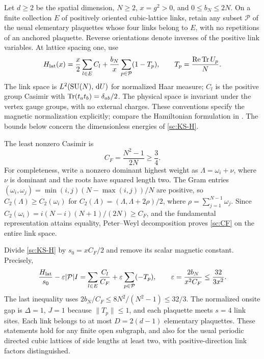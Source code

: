 Let $d\ge2$ be the spatial dimension, $N\ge2$, $x=g^2>0$, and
$0\le b_N\le2N$. On a finite collection $E$ of positively oriented
cubic-lattice links, retain any subset $\mathcal P$ of the usual
elementary plaquettes whose four links belong to $E$, with no repetitions
of an anchored plaquette. Reverse
orientations denote inverses of the positive link variables.
At lattice spacing one, use
\begin{equation}
 H_{\rm lat}(x)=\frac{x}{2}\sum_{l\in E}C_l+
       \frac{b_N}{x}\sum_{p\in\mathcal P}(1-T_p),
 \qquad T_p=\frac{\operatorname{Re}\operatorname{Tr} U_p}{N}.
 \label{sc:KS-H}
\end{equation}
The link space is $L^2(\operatorname{SU}(N),\,\mathrm d U)$ for normalized Haar measure;
$C_l$ is the positive group Casimir with
$\operatorname{Tr}(t_at_b)=\delta_{ab}/2$. The physical space is invariant under
the vertex gauge groups, with no external charges. These conventions
specify the magnetic normalization explicitly; compare the Hamiltonian
formulation in \cite{KS}. The bounds below concern the dimensionless
energies of \eqref{sc:KS-H}.

The least nonzero Casimir is
\begin{equation}
 C_F=\frac{N^2-1}{2N}\ge\frac34.
 \label{sc:CF}
\end{equation}
For completeness, write a nonzero dominant highest weight as
$\Lambda=\omega_i+\nu$, where $\nu$ is dominant and the roots have
squared length two. The Gram entries
$(\omega_i,\omega_j)=\min(i,j)(N-\max(i,j))/N$ are positive, so
$C_2(\Lambda)\ge C_2(\omega_i)$ for
$C_2(\Lambda)=(\Lambda,\Lambda+2\rho)/2$,
where $\rho=\sum_{j=1}^{N-1}\omega_j$.
Since $C_2(\omega_i)=i(N-i)(N+1)/(2N)\ge C_F$, and the
fundamental representation attains equality, Peter--Weyl decomposition
proves \eqref{sc:CF} on the entire link space.

Divide \eqref{sc:KS-H} by $s_0=xC_F/2$ and remove its scalar
magnetic constant. Precisely,
\begin{equation}
 \frac{H_{\rm lat}}{s_0}-\varepsilon|\mathcal P|I
   =\sum_{l\in E}\frac{C_l}{C_F}
        +\varepsilon\sum_{p\in\mathcal P}(-T_p),
 \qquad
 \varepsilon=\frac{2b_N}{x^2C_F}\le\frac{32}{3x^2}.
 \label{sc:normalization}
\end{equation}
The last inequality uses
$2b_N/C_F\le8N^2/(N^2-1)\le32/3$.
The normalized onsite gap is $\Delta=1$, $J=1$ because
$\|T_p\|\le1$, and each plaquette meets $s=4$ link sites.
Each link belongs to at most $D=2(d-1)$ elementary plaquettes.
These statements hold for any finite open subgraph, and also for
the usual periodic directed cubic lattices of side lengths at least
two, with positive-direction link factors distinguished.

